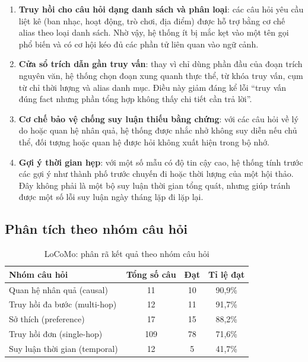 \documentclass[../main.tex]{subfiles}
\begin{document}
\begin{enumerate}
    \item \textbf{Truy hồi cho câu hỏi dạng danh sách và phân loại}: các câu hỏi yêu cầu liệt kê (ban nhạc, hoạt động, trò chơi, địa điểm) được hỗ trợ bằng cơ chế alias theo loại danh sách. Nhờ vậy, hệ thống ít bị mắc kẹt vào một tên gọi phổ biến và có cơ hội kéo đủ các phần tử liên quan vào ngữ cảnh.
    \item \textbf{Cửa sổ trích dẫn gần truy vấn}: thay vì chỉ dùng phần đầu của đoạn trích nguyên văn, hệ thống chọn đoạn xung quanh thực thể, từ khóa truy vấn, cụm từ chỉ thời lượng và alias danh mục. Điều này giảm đáng kể lỗi ``truy vấn đúng fact nhưng phần tổng hợp không thấy chi tiết cần trả lời''.
    \item \textbf{Cơ chế bảo vệ chống suy luận thiếu bằng chứng}: với các câu hỏi về lý do hoặc quan hệ nhân quả, hệ thống được nhắc nhở không suy diễn nếu chủ thể, đối tượng hoặc quan hệ được hỏi không xuất hiện trong bộ nhớ.
    \item \textbf{Gợi ý thời gian hẹp}: với một số mẫu có độ tin cậy cao, hệ thống tính trước các gợi ý như thành phố trước chuyến đi hoặc thời lượng của một hội thảo. Đây không phải là một bộ suy luận thời gian tổng quát, nhưng giúp tránh được một số lỗi suy luận ngày tháng lặp đi lặp lại.
\end{enumerate}

\subsection{Phân tích theo nhóm câu hỏi}

\begin{table}[H]
\centering
\caption{LoCoMo: phân rã kết quả theo nhóm câu hỏi}
\label{tab:locomo_category_breakdown}
\small
\begin{tabular}{@{}lccc@{}}
\toprule
\textbf{Nhóm câu hỏi} & \textbf{Tổng số câu} & \textbf{Đạt} & \textbf{Tỉ lệ đạt} \\
\midrule
Quan hệ nhân quả (causal) & 11 & 10 & 90,9\% \\
Truy hồi đa bước (multi-hop) & 12 & 11 & 91,7\% \\
Sở thích (preference) & 17 & 15 & 88,2\% \\
Truy hồi đơn (single-hop) & 109 & 78 & 71,6\% \\
Suy luận thời gian (temporal) & 12 & 5 & 41,7\% \\
\bottomrule
\end{tabular}
\end{table}
\end{document}
